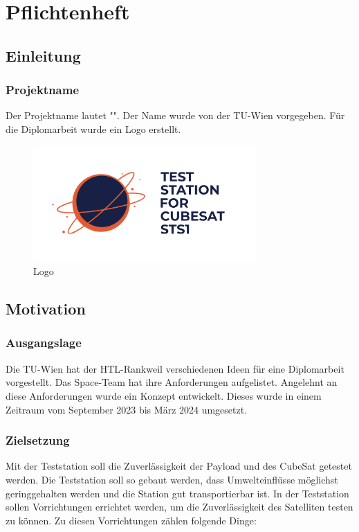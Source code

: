 \section{Pflichtenheft}\label{sec:pflichtenheft}
\subsection{Einleitung}
\subsubsection{Projektname}
Der Projektname lautet "\Thema". Der Name wurde von der TU-Wien vorgegeben. Für die Diplomarbeit wurde ein Logo erstellt. 
\begin{figure}[H]
    \centering
    \includegraphics[scale=1.1]{image/logodiplo.png}
    \caption{Logo}
    \label{fig:enter-label}
\end{figure}
\subsection{Motivation}
\subsubsection{Ausgangslage}
Die TU-Wien hat der HTL-Rankweil verschiedenen Ideen für eine Diplomarbeit vorgestellt. Das Space-Team hat ihre Anforderungen aufgelistet. Angelehnt an diese Anforderungen wurde ein Konzept entwickelt. Dieses wurde in einem Zeitraum vom September 2023 bis März 2024 umgesetzt.
\subsubsection{Zielsetzung}
Mit der Teststation soll die Zuverlässigkeit der Payload und des CubeSat getestet werden. Die Teststation soll so gebaut werden, dass Umwelteinflüsse möglichst geringgehalten werden und die Station gut transportierbar ist. In der Teststation sollen Vorrichtungen errichtet werden, um die Zuverlässigkeit des Satelliten testen zu können. Zu diesen Vorrichtungen zählen folgende Dinge:

